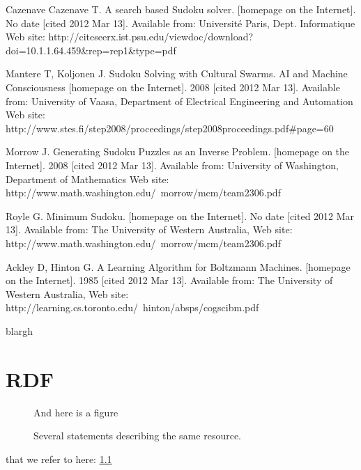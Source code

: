 \documentclass[a4paper,11pt]{kth-mag}
\begin{document}
\begin{thebibliography}{99}
Cazenave Cazenave T. A search based Sudoku solver. [homepage on the Internet]. No date [cited 2012 Mar 13]. Available from: Université Paris, Dept. Informatique Web site: http://citeseerx.ist.psu.edu/viewdoc/download?doi=10.1.1.64.459\&rep=rep1\&type=pdf

Mantere T, Koljonen J. Sudoku Solving with Cultural Swarms. AI and Machine Consciousness [homepage on the Internet]. 2008 [cited 2012 Mar 13]. Available from: University of Vaasa, Department of Electrical Engineering and Automation Web site: http://www.stes.fi/step2008/proceedings/step2008proceedings.pdf\#page=60

Morrow J. Generating Sudoku Puzzles as an Inverse Problem. [homepage on the Internet]. 2008 [cited 2012 Mar 13]. Available from: University of Washington, Department of Mathematics Web site: http://www.math.washington.edu/~morrow/mcm/team2306.pdf

Royle G. Minimum Sudoku. [homepage on the Internet]. No date [cited 2012 Mar 13]. Available from: The University of Western Australia, Web site: http://www.math.washington.edu/~morrow/mcm/team2306.pdf

Ackley D, Hinton G. A Learning Algorithm for Boltzmann Machines. [homepage on the Internet]. 1985 [cited 2012 Mar 13]. Available from: The University of Western Australia, Web site: http://learning.cs.toronto.edu/~hinton/absps/cogscibm.pdf

blargh
\end{thebibliography}

\appendix
\addappheadtotoc
\chapter{RDF}\label{appA}

\begin{figure}[ht]
\begin{center}
And here is a figure
\caption{\small{Several statements describing the same resource.}}\label{RDF_4}
\end{center}
\end{figure}

that we refer to here: \ref{RDF_4}
\end{document}
